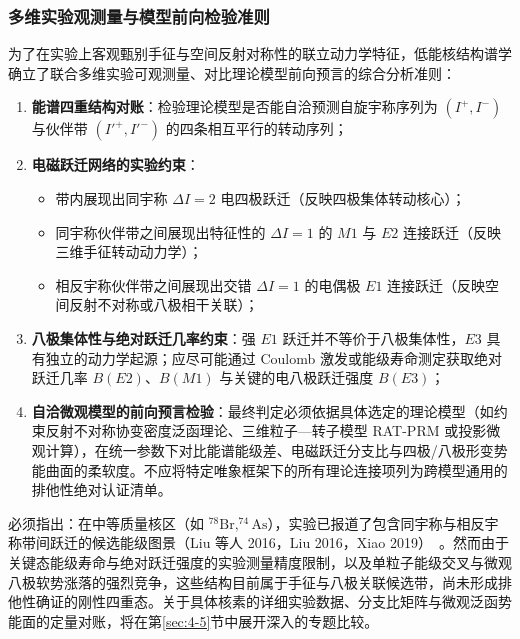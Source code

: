 \subsubsection{多维实验观测量与模型前向检验准则}

为了在实验上客观甄别手征与空间反射对称性的联立动力学特征，低能核结构谱学确立了联合多维实验可观测量、对比理论模型前向预言的综合分析准则：
\begin{enumerate}
\item \textbf{能谱四重结构对账}：检验理论模型是否能自洽预测自旋宇称序列为 $(I^+, I^-)$ 与伙伴带 $(I'^+, I'^-)$ 的四条相互平行的转动序列；
\item \textbf{电磁跃迁网络的实验约束}：
\begin{itemize}
\item 带内展现出同宇称 $\Delta I = 2$ 电四极跃迁（反映四极集体转动核心）；
\item 同宇称伙伴带之间展现出特征性的 $\Delta I = 1$ 的 $M1$ 与 $E2$ 连接跃迁（反映三维手征转动动力学）；
\item 相反宇称伙伴带之间展现出交错 $\Delta I = 1$ 的电偶极 $E1$ 连接跃迁（反映空间反射不对称或八极相干关联）；
\end{itemize}
\item \textbf{八极集体性与绝对跃迁几率约束}：强 $E1$ 跃迁并不等价于八极集体性，$E3$ 具有独立的动力学起源；应尽可能通过 Coulomb 激发或能级寿命测定获取绝对跃迁几率 $B(E2)$、$B(M1)$ 与关键的电八极跃迁强度 $B(E3)$；
\item \textbf{自洽微观模型的前向预言检验}：最终判定必须依据具体选定的理论模型（如约束反射不对称协变密度泛函理论、三维粒子—转子模型 RAT-PRM 或投影微观计算），在统一参数下对比能谱能级差、电磁跃迁分支比与四极/八极形变势能曲面的柔软度。不应将特定唯象框架下的所有理论连接项列为跨模型通用的排他性绝对认证清单。
\end{enumerate}

必须指出：在中等质量核区（如 $^{78}\mathrm{Br}, ^{74}\mathrm{As}$），实验已报道了包含同宇称与相反宇称带间跃迁的候选能级图景（Liu 等人 2016，Liu 2016，Xiao 2019）~\cite{liu-2016-octupole-correlations-multiple-chiral-doublet-bands-78br,liu-chen-2016-78br-chirality-reflection-symmetry-thesis,xiao-xiao-2019-high-spin-74as-thesis}。然而由于关键态能级寿命与绝对跃迁强度的实验测量精度限制，以及单粒子能级交叉与微观八极软势涨落的强烈竞争，这些结构目前属于手征与八极关联候选带，尚未形成排他性确证的刚性四重态。关于具体核素的详细实验数据、分支比矩阵与微观泛函势能面的定量对账，将在第\ref{sec:4-5}节中展开深入的专题比较。
